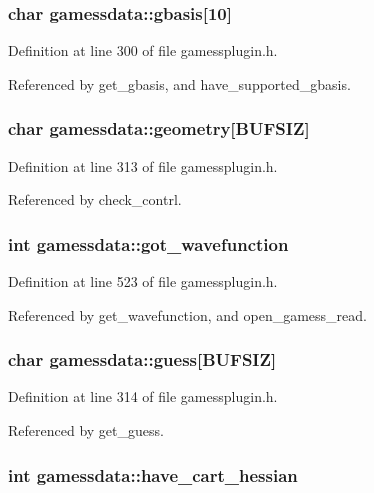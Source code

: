 \subsubsection{\setlength{\rightskip}{0pt plus 5cm}char gamessdata::gbasis[10]}\label{structgamessdata_m4}




Definition at line 300 of file gamessplugin.h.

Referenced by get\_\-gbasis, and have\_\-supported\_\-gbasis.
\subsubsection{\setlength{\rightskip}{0pt plus 5cm}char gamessdata::geometry[BUFSIZ]}\label{structgamessdata_m13}




Definition at line 313 of file gamessplugin.h.

Referenced by check\_\-contrl.
\subsubsection{\setlength{\rightskip}{0pt plus 5cm}int gamessdata::got\_\-wavefunction}\label{structgamessdata_m73}




Definition at line 523 of file gamessplugin.h.

Referenced by get\_\-wavefunction, and open\_\-gamess\_\-read.
\subsubsection{\setlength{\rightskip}{0pt plus 5cm}char gamessdata::guess[BUFSIZ]}\label{structgamessdata_m14}




Definition at line 314 of file gamessplugin.h.

Referenced by get\_\-guess.
\subsubsection{\setlength{\rightskip}{0pt plus 5cm}int gamessdata::have\_\-cart\_\-hessian}\label{structgamessdata_m38}




